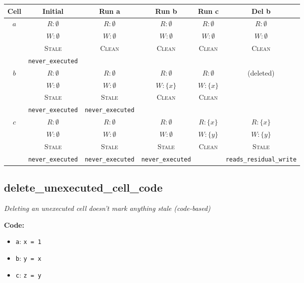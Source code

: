 \documentclass{article}
\begin{document}
\begin{center}
\small
\begin{tabular}{|c|c|c|c|c|c|}
\hline
\textbf{Cell} & \textbf{Initial} & \textbf{Run a} & \textbf{Run b} & \textbf{Run c} & \textbf{Del b} \\
\hline
\multirow{4}{*}{$a$}
  & $R: \emptyset$ & $R: \emptyset$ & $R: \emptyset$ & $R: \emptyset$ & $R: \emptyset$ \\
  & $W: \emptyset$ & $W: \emptyset$ & $W: \emptyset$ & $W: \emptyset$ & $W: \emptyset$ \\
  & \textsc{Stale} & \textsc{Clean} & \textsc{Clean} & \textsc{Clean} & \textsc{Clean} \\
  & \footnotesize\texttt{never\_executed} &  &  &  &  \\
\hline
\multirow{4}{*}{$b$}
  & $R: \emptyset$ & $R: \emptyset$ & $R: \emptyset$ & $R: \emptyset$ & (deleted) \\
  & $W: \emptyset$ & $W: \emptyset$ & $W: \{x\}$ & $W: \{x\}$ &  \\
  & \textsc{Stale} & \textsc{Stale} & \textsc{Clean} & \textsc{Clean} &  \\
  & \footnotesize\texttt{never\_executed} & \footnotesize\texttt{never\_executed} &  &  &  \\
\hline
\multirow{4}{*}{$c$}
  & $R: \emptyset$ & $R: \emptyset$ & $R: \emptyset$ & $R: \{x\}$ & $R: \{x\}$ \\
  & $W: \emptyset$ & $W: \emptyset$ & $W: \emptyset$ & $W: \{y\}$ & $W: \{y\}$ \\
  & \textsc{Stale} & \textsc{Stale} & \textsc{Stale} & \textsc{Clean} & \textsc{Stale} \\
  & \footnotesize\texttt{never\_executed} & \footnotesize\texttt{never\_executed} & \footnotesize\texttt{never\_executed} &  & \footnotesize\texttt{reads\_residual\_write} \\
\hline
\end{tabular}
\end{center}


\subsection{delete\_unexecuted\_cell\_code}
\textit{Deleting an unexecuted cell doesn't mark anything stale (code-based)}

\textbf{Code:}
\begin{itemize}
  \item \texttt{a}: \verb|x = 1|
  \item \texttt{b}: \verb|y = x|
  \item \texttt{c}: \verb|z = y|
\end{itemize}
\end{document}
